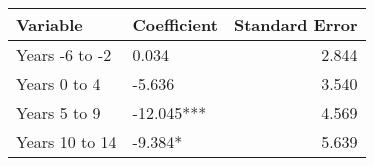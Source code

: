 \begin{tabular}{llr}
\toprule
      Variable & Coefficient &  Standard Error \\
\midrule
Years -6 to -2 &       0.034 &           2.844 \\
  Years 0 to 4 &      -5.636 &           3.540 \\
  Years 5 to 9 &  -12.045*** &           4.569 \\
Years 10 to 14 &     -9.384* &           5.639 \\
\bottomrule
\end{tabular}
